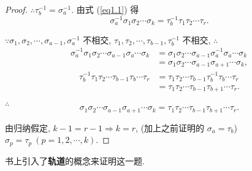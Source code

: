 \documentclass[color=black,device=normal,lang=cn,mode=geye]{elegantnote}
\begin{document}
\begin{proof}
    $\therefore\tau_b^{-1}=\sigma_a^{-1}$. 由式 (\ref{eq1.1}) 得
    \[\sigma_a^{-1}\sigma_1\sigma_2\cdots\sigma_k=\tau_b^{-1}\tau_1\tau_2\cdots\tau_r.\]

    $\because\sigma_1,\sigma_2,\cdots,\sigma_{a-1},\sigma_a^{-1}$ 不相交, $\tau_1,\tau_2,\cdots,\tau_{b-1},\tau_b^{-1}$ 不相交, $\therefore$
    \begin{align*}
        \sigma_a^{-1}\sigma_1\sigma_2\cdots\sigma_{a-1}\sigma_a\cdots\sigma_k & =\sigma_1\sigma_2\cdots\sigma_{a-1}\sigma_a^{-1}\sigma_a\cdots\sigma_k \\
        & =\sigma_1\sigma_2\cdots\sigma_{a-1}\sigma_{a+1}\cdots\sigma_k,
    \end{align*}
    \begin{align*}
        \tau_b^{-1}\tau_1\tau_2\cdots\tau_{b-1}\tau_b\cdots\tau_r & =\tau_1\tau_2\cdots\tau_{b-1}\tau_b^{-1}\tau_b\cdots\tau_r \\
        & =\tau_1\tau_2\cdots\tau_{b-1}\tau_{b+1}\cdots\tau_r.
    \end{align*}

    $\therefore$
    \[\sigma_1\sigma_2\cdots\sigma_{a-1}\sigma_{a+1}\cdots\sigma_k=\tau_1\tau_2\cdots\tau_{b-1}\tau_{b+1}\cdots\tau_r.\]

    由归纳假定, $k-1=r-1\Rightarrow k=r$, (加上之前证明的 $\sigma_a=\tau_b$) $\sigma_p=\tau_p\ (p=1,2,\cdots,k)$.
\end{proof}

书上引入了\textbf{轨道}的概念来证明这一题.
\end{document}
